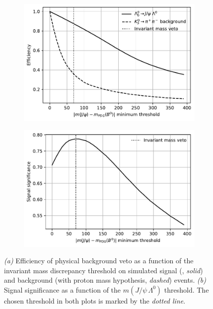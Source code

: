 \begin{figure}[t]
	\centering
	\begin{subfigure}{.45\textwidth}
		\includegraphics[height=.2\textheight]{graphics/04-event_selection/phys_veto_efficiencies.pdf}
		\caption{}
		\label{fig:4:phys_bkg_veto_eff_thres}
	\end{subfigure}
	\begin{subfigure}{.45\textwidth}
		\includegraphics[height=.2\textheight]{graphics/04-event_selection/phys_veto_significances.pdf}
		\caption{}
		\label{fig:4:phys_veto_significances}
	\end{subfigure}
	\caption{\textit{(a)} Efficiency of physical background veto as a function of the invariant mass discrepancy threshold on simulated signal (\demonstratorshort, \textit{solid}) and background (\physbkgshort with proton mass hypothesis, \textit{dashed}) events.
	\textit{(b)} Signal significance as a function of the $m(J/\psi\,\Lambda^0)$ threshold. The chosen threshold in both plots is marked by the \textit{dotted line}.}
	\label{fig:4:phys_bkg_veto_eff}
\end{figure}

